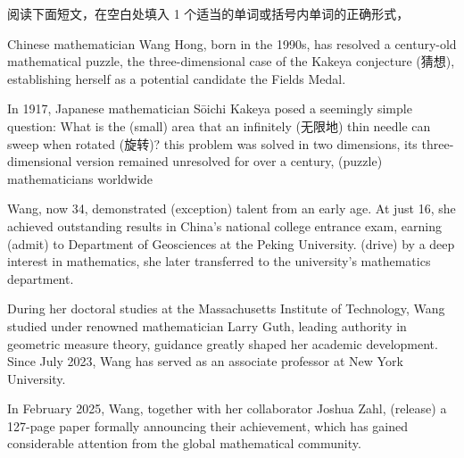 \documentclass{英语试卷}
\begin{document}
\par 阅读下面短文，在空白处填入 1 个适当的单词或括号内单词的正确形式，\par
\par Chinese mathematician Wang Hong, born in the 1990s, has resolved a century-old mathematical puzzle, the three-dimensional case of the Kakeya conjecture (猜想), establishing herself as a potential candidate  the Fields Medal.\par
\par In 1917, Japanese mathematician Sōichi Kakeya posed a seemingly simple question: What is the  (small) area that an infinitely (无限地) thin needle can sweep when rotated (旋转)?  this problem was solved in two dimensions, its three-dimensional version remained unresolved for over a century,  (puzzle) mathematicians worldwide\par
\par Wang, now 34, demonstrated  (exception) talent from an early age. At just 16, she achieved outstanding results in China's national college entrance exam, earning  (admit) to Department of Geosciences at the Peking University.  (drive) by a deep interest in mathematics, she later transferred to the university's mathematics department.\par
\par During her doctoral studies at the Massachusetts Institute of Technology, Wang studied under renowned mathematician Larry Guth,  leading authority in geometric measure theory,  guidance greatly shaped her academic development. Since July 2023, Wang has served as an associate professor at New York University.\par
\par In February 2025, Wang, together with her collaborator Joshua Zahl,  (release) a 127-page paper formally announcing their achievement, which has gained considerable attention from the global mathematical community.\par
\end{document}
